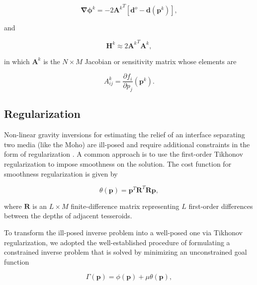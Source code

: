 \documentclass[extra,mreferee]{gji}
\begin{document}
\begin{equation}
    \mathbf{\nabla\phi}^k = -2{\mathbf{A}^k}^T[\mathbf{d}^o - \mathbf{d}(\mathbf{p}^k)],
    \label{eq:gradient}
\end{equation}

\noindent
and

\begin{equation}
    \mathbf{H}^k \approx 2{\mathbf{A}^k}^T{\mathbf{A}^k},
    \label{eq:hessian}
\end{equation}

\noindent in which
$\mathbf{A}^k$ is the $N \times M$ Jacobian or sensitivity matrix
whose elements are

\begin{equation}
    A_{ij}^k = \dfrac{\partial f_i}{\partial p_j}(\mathbf{p}^k).
    \label{eq:jacobian}
\end{equation}



\subsection{Regularization}

Non-linear gravity inversions for estimating the relief of an interface
separating two media (like the Moho) are ill-posed and require additional
constraints in the form of regularization \citep{silva2001b}.
A common approach is to use the first-order Tikhonov regularization
\citep{tikhonov1977} to impose smoothness on the solution.
The cost function for smoothness regularization is given by

\begin{equation}
    \theta(\mathbf{p}) = \mathbf{p}^T\mathbf{R}^T\mathbf{R}\mathbf{p},
    \label{eq:regul}
\end{equation}

\noindent where $\mathbf{R}$ is an $L \times M$ finite-difference matrix
representing $L$ first-order differences between the depths of adjacent
tesseroids.

To transform the ill-posed inverse problem into a well-posed one via Tikhonov
regularization, we adopted the well-established procedure
of formulating a constrained inverse problem that is solved by minimizing an
unconstrained goal function

\begin{equation}
    \Gamma(\mathbf{p}) = \phi(\mathbf{p}) + \mu\theta(\mathbf{p}),
    \label{eq:goalfunction}
\end{equation}
\end{document}
